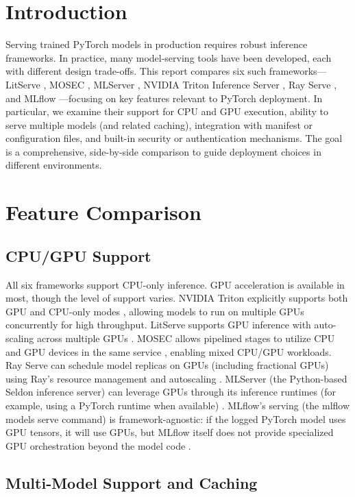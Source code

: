 \section{Introduction}

Serving trained PyTorch models in production requires robust inference frameworks. In practice, many model-serving tools have been developed, each with different design trade-offs. This report compares six such frameworks—LitServe \cite{litserve}, MOSEC \cite{mosec}, MLServer \cite{mlserver}, NVIDIA Triton Inference Server \cite{triton}, Ray Serve \cite{ray}, and MLflow \cite{mlflow}—focusing on key features relevant to PyTorch deployment. In particular, we examine their support for CPU and GPU execution, ability to serve multiple models (and related caching), integration with manifest or configuration files, and built-in security or authentication mechanisms. The goal is a comprehensive, side-by-side comparison to guide deployment choices in different environments.

\section{Feature Comparison}

\subsection{CPU/GPU Support}

All six frameworks support CPU-only inference. GPU acceleration is available in most, though the level of support varies. NVIDIA Triton explicitly supports both GPU and CPU-only modes \cite{triton}, allowing models to run on multiple GPUs concurrently for high throughput. LitServe supports GPU inference with auto-scaling across multiple GPUs \cite{litserve}. MOSEC allows pipelined stages to utilize CPU and GPU devices in the same service \cite{mosec}, enabling mixed CPU/GPU workloads. Ray Serve can schedule model replicas on GPUs (including fractional GPUs) using Ray’s resource management and autoscaling \cite{ray}. MLServer (the Python-based Seldon inference server) can leverage GPUs through its inference runtimes (for example, using a PyTorch runtime when available) \cite{mlserver}. MLflow’s serving (the mlflow models serve command) is framework-agnostic: if the logged PyTorch model uses GPU tensors, it will use GPUs, but MLflow itself does not provide specialized GPU orchestration beyond the model code \cite{mlflow}.

\subsection{Multi-Model Support and Caching}


